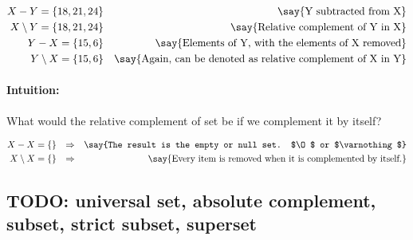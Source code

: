 \documentclass[12pt]{article}
\begin{document}
\begin{align}
  X - Y = \{18, 21, 24\} &&
  \text{\say{Y subtracted from X}} \\
  X \setminus Y = \{18, 21, 24\} &&
  \text{\say{Relative complement of Y in X}} \\
  Y - X = \{15, 6\} &&
  \text{\say{Elements of Y, with the elements of X removed}} \\
  Y \setminus X = \{15, 6\} &&
  \text{\say{Again, can be denoted as relative complement of X in Y}}
\end{align}%

\paragraph{Intuition:} What would the relative complement of set be if we complement it by itself?

\begin{align}
  X - X = \{\} && \Rightarrow &&
  \text{\say{The result is the empty or null set. $\O$ or $\varnothing$}} \\
  X \setminus X = \{\} && \Rightarrow &&
  \text{\say{Every item is removed when it is complemented by itself.}}
\end{align}%

\subsection{TODO: universal set, absolute complement, subset, strict subset, superset}
\end{document}

